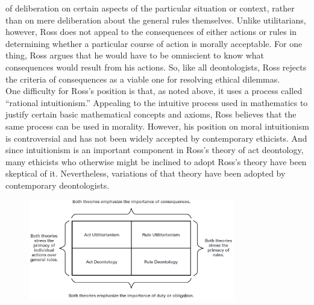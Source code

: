\documentclass[12pt]{article}
\theoremstyle{definition}
\begin{document}
of deliberation on certain aspects of the particular situation or context, rather than on
mere deliberation about the general rules themselves. Unlike utilitarians, however, Ross
does not appeal to the consequences of either actions or rules in determining whether a
particular course of action is morally acceptable. For one thing, Ross argues that he
would have to be omniscient to know what consequences would result from his actions.
So, like all deontologists, Ross rejects the criteria of consequences as a viable one for
resolving ethical dilemmas.\\
One difficulty for Ross’s position is that, as noted above, it uses a process called
“rational intuitionism.” Appealing to the intuitive process used in mathematics to justify
certain basic mathematical concepts and axioms, Ross believes that the same process can
be used in morality. However, his position on moral intuitionism is controversial and has
not been widely accepted by contemporary ethicists. And since intuitionism is an
important component in Ross’s theory of act deontology, many ethicists who otherwise might be inclined to adopt Ross’s theory have been skeptical of it. Nevertheless,
variations of that theory have been adopted by contemporary deontologists.
\begin{figure}[h]
\centering
\includegraphics[width=0.8\textwidth]{4.png}
\end{figure}
\end{document}
